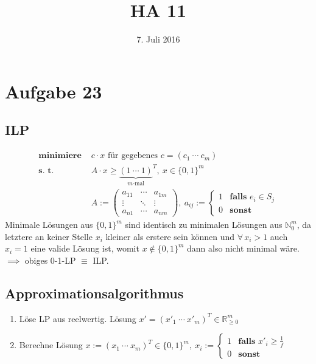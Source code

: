 



\title{HA 11}
\date{7. Juli 2016}

\maketitle

\section*{Aufgabe 23}
\label{sec:Aufgabe 23}

\subsection{ILP}
\label{sub:ILP}

\begin{align*}
	\textbf{minimiere } & c \cdot x \text{ für gegebenes $c = (c_1\ \cdots\ c_m)$} \\
	\textbf{s. t. } & A \cdot x \ge {\underbrace{(1\ \cdots\ 1)}_{m \text{-mal}}}^T,\ x \in \{ 0, 1 \}^m \\
	& A := \begin{pmatrix}
		a_{1 1} & \cdots & a_{1 m} \\
		\vdots & \ddots & \vdots \\
		a_{n 1} & \cdots & a_{n m}
	\end{pmatrix},\ a_{ij} := \begin{cases}
		1 & \textbf{falls } e_i \in S_j \\
		0 & \textbf{sonst}
	\end{cases}
\end{align*}
Minimale Lösungen aus $\{ 0, 1 \}^m$ sind identisch zu minimalen Lösungen aus $\mathbb{N}_0^m$, da letztere an keiner Stelle $x_i$ kleiner als erstere sein können und $\forall\, x_i > 1$ auch $x_i = 1$ eine valide Lösung ist, womit $x \notin \{ 0, 1 \}^m$ dann also nicht minimal wäre. $\implies$ obiges 0-1-LP $\equiv$ ILP.

\subsection{Approximationsalgorithmus}
\label{sub:Approximationsalgorithmus}

\begin{enumerate}
	\item Löse LP aus  reelwertig. Lösung $x' = (x'_1\ \cdots\ x'_m)^T \in \mathbb{R}_{\ge 0}^m$
	\item Berechne Lösung $x := (x_1\ \cdots\ x_m)^T \in \{ 0, 1 \}^m,\ x_i := \begin{cases}
		1 & \textbf{falls } x'_i \ge \frac{1}{f} \\
		0 & \textbf{sonst}
	\end{cases}$
\end{enumerate}

